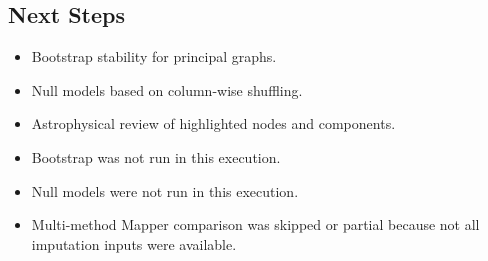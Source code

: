 \subsection*{Next Steps}
\begin{itemize}
\item Bootstrap stability for principal graphs.
\item Null models based on column-wise shuffling.
\item Astrophysical review of highlighted nodes and components.
\item Bootstrap was not run in this execution.
\item Null models were not run in this execution.
\item Multi-method Mapper comparison was skipped or partial because not all imputation inputs were available.
\end{itemize}

